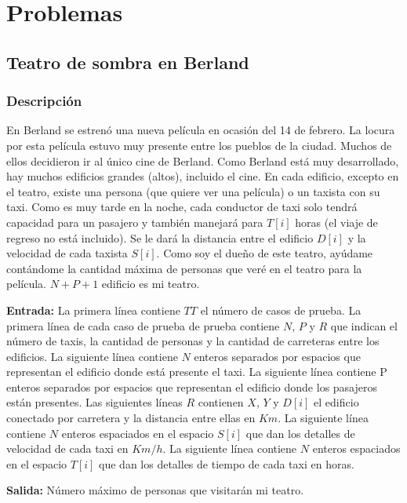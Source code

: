 \documentclass[12pt]{article}
\newcommand{\nl}{\vspace{0.3cm}}
\begin{document}
\section{Problemas}

\subsection{Teatro de sombra en Berland}

\subsubsection{Descripción}

En Berland se estrenó una nueva película en ocasión del 14 de febrero. La locura por esta película estuvo muy presente entre los pueblos de la ciudad. Muchos de ellos decidieron ir al único cine de Berland. Como Berland está muy desarrollado, hay muchos edificios grandes (altos), incluido el cine. En cada edificio, excepto en el teatro, existe una persona (que quiere ver una película) o un taxista con su taxi. Como es muy tarde en la noche, cada conductor de taxi solo tendrá capacidad para un pasajero y también manejará para $T[i]$ horas (el viaje de regreso no está incluido). Se le dará la distancia entre el edificio $D [i]$ y la velocidad de cada taxista $S[i]$. Como soy el dueño de este teatro, ayúdame contándome la cantidad máxima de personas que veré en el teatro para la película. $N + P + 1$ edificio es mi teatro.

\nl

\textbf{Entrada:} La primera línea contiene $TT$ el número de casos de prueba. La primera línea de cada caso de prueba de prueba contiene $N$, $P$ y $R$ que indican el número de taxis, la cantidad de personas y la cantidad de carreteras entre los edificios. La siguiente línea contiene $N$ enteros separados por espacios que representan el edificio donde está presente el taxi. La siguiente línea contiene P enteros separados por espacios que representan el edificio donde los pasajeros están presentes. Las siguientes líneas $R$ contienen $X$, $Y$ y $D[i]$ el edificio conectado por carretera y la distancia entre ellas en $Km$. La siguiente línea contiene $N$ enteros espaciados en el espacio $S[i]$ que dan los detalles de velocidad de cada taxi en $Km/h$. La siguiente línea contiene $N$ enteros espaciados en el espacio $T[i]$ que dan los detalles de tiempo de cada taxi en horas.

\nl

\textbf{Salida:} Número máximo de personas que visitarán mi teatro.
\end{document}

